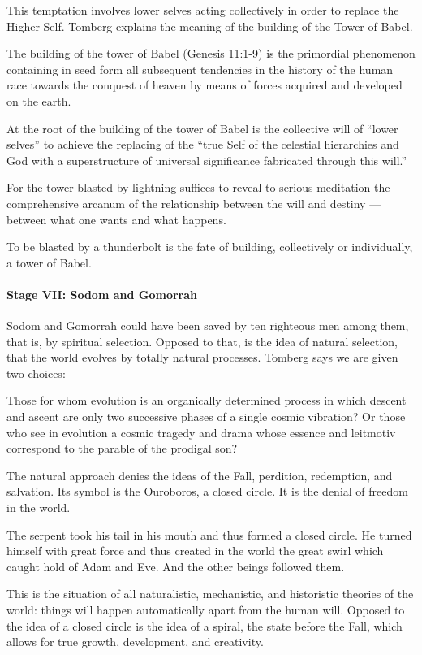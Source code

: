 This temptation involves lower selves acting collectively in order to replace the Higher Self. Tomberg explains the
meaning of the building of the Tower of Babel.

\begin{quotex}
The building of the tower of Babel (Genesis 11:1-9) is the primordial phenomenon containing in seed form all subsequent
tendencies in the history of the human race towards the conquest of heaven by means of forces acquired and developed on
the earth.

At the root of the building of the tower of Babel is the collective will of “lower selves” to achieve the replacing of
the “true Self of the celestial hierarchies and God with a superstructure of universal significance fabricated through
this will.” 

\end{quotex}
For the tower blasted by lightning suffices to reveal to serious meditation the comprehensive arcanum of the
relationship between the will and destiny — between what one wants and what happens.

To be blasted by a thunderbolt is the fate of building, collectively or individually, a tower of Babel.

\paragraph{Stage VII: Sodom and Gomorrah}
Sodom and Gomorrah could have been saved by ten righteous men among them, that is, by spiritual selection. Opposed to
that, is the idea of natural selection, that the world evolves by totally natural processes. Tomberg says we are given
two choices:

\begin{quotex}
Those for whom evolution is an organically determined process in which descent and ascent are only two successive phases
of a single cosmic vibration? Or those who see in evolution a cosmic tragedy and drama whose essence and leitmotiv
correspond to the parable of the prodigal son? 

\end{quotex}
The natural approach denies the ideas of the Fall, perdition, redemption, and salvation. Its symbol is the Ouroboros, a
closed circle. It is the denial of freedom in the world.

\begin{quotex}
The serpent took his tail in his mouth and thus formed a closed circle. He turned himself with great force and thus
created in the world the great swirl which caught hold of Adam and Eve. And the other beings followed them. 

\end{quotex}
This is the situation of all naturalistic, mechanistic, and historistic theories of the world: things will happen
automatically apart from the human will. Opposed to the idea of a closed circle is the idea of a spiral, the state
before the Fall, which allows for true growth, development, and creativity.


